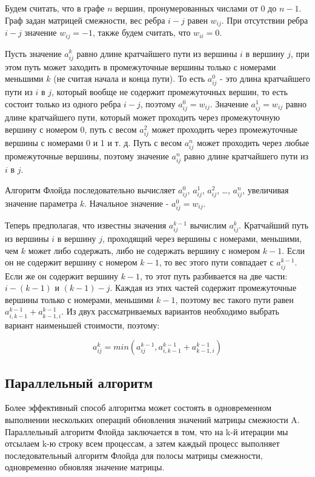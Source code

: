 Будем считать, что в графе $n$ вершин, пронумерованных числами от $0$ до $n - 1$. Граф задан матрицей смежности, вес ребра $i - j$ равен $w_{ij}$. При отсутствии ребра $i - j$ значение $w_{ij} = -1$, также будем считать, что $w_{ii} = 0$.

Пусть значение $a^k_{ij}$ равно длине кратчайшего пути из вершины $i$ в вершину $j$, при этом путь может заходить в промежуточные вершины только с номерами меньшими $k$ (не считая начала и конца пути). То есть $a^0_{ij}$ - это длина кратчайшего пути из $i$ в $j$, который вообще не содержит промежуточных вершин, то есть состоит только из одного ребра $i - j$, поэтому $a^0_{ij} = w_{ij}$. Значение $a^1_{ij} = w_{ij}$ равно длине кратчайшего пути, который может проходить через промежуточную вершину с номером 0, путь с весом $a^2_{ij}$ может проходить через промежуточные вершины с номерами 0 и 1 и т. д. Путь с весом $a^n_{ij}$ может проходить через любые промежуточные вершины, поэтому значение $a^n_{ij}$ равно длине кратчайшего пути из $i$ в $j$.

Алгоритм Флойда последовательно вычисляет $a^0_{ij}$, $a^1_{ij}$, $a^2_{ij}$, …, $a^n_{ij}$, увеличивая значение параметра $k$. Начальное значение - $a^0_{ij} = w_{ij}$.

Теперь предполагая, что известны значения $a^{k - 1}_{ij}$ вычислим $a^k_{ij}$. Кратчайший путь из вершины $i$ в вершину $j$, проходящий через вершины с номерами, меньшими, чем $k$ может либо содержать, либо не содержать вершину с номером $k - 1$. Если он не содержит вершину с номером $k - 1$, то вес этого пути совпадает с $a^{k - 1}_{ij}$. Если же он содержит вершину $k - 1$, то этот путь разбивается на две части: $i - (k - 1)$ и $(k - 1) - j$. Каждая из этих частей содержит промежуточные вершины только с номерами, меньшими $k - 1$, поэтому вес такого пути равен $a^{k - 1}_{i,k-1} + a^{k - 1}_{k-1,i}$. Из двух рассматриваемых вариантов необходимо выбрать вариант наименьшей стоимости, поэтому:

\begin{equation}
	a^k_{ij} = min(a^{k - 1}_{ij}, a^{k - 1}_{i,k-1} + a^{k - 1}_{k-1,i})
\end{equation}

\subsection{Параллельный алгоритм}

Более эффективный способ алгоритма может состоять в одновременном выполнении нескольких операций обновления значений матрицы смежности A. Параллельный алгоритм Флойда заключается в том, что на k-й итерации мы отсылаем k-ю строку всем процессам, а затем каждый процесс выполняет последовательный алгоритм Флойда для полосы матрицы смежности, одновременно обновляя значение матрицы.

